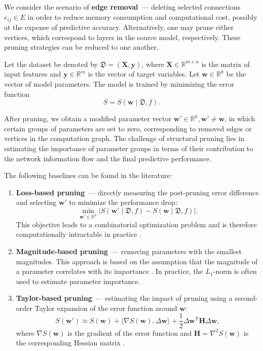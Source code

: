 \documentclass[runningheads]{llncs}
\begin{document}
We consider the scenario of \textbf{edge removal}~--- deleting selected connections $e_{ij} \in E$ in order to reduce memory consumption and computational cost, possibly at the expense of predictive accuracy. Alternatively, one may prune either vertices, which correspond to layers in the source model, respectively. These pruning strategies can be reduced to one another.

Let the dataset be denoted by $\mathfrak{D} = (\mathbf{X}, \mathbf{y})$, where $\mathbf{X} \in \mathbb{R}^{m \times n}$ is the matrix of input features and $\mathbf{y} \in \mathbb{R}^m$ is the vector of target variables. Let $\mathbf{w} \in \mathbb{R}^k$ be the vector of model parameters. The model is trained by minimizing the error function
\begin{equation}
S = S(\mathbf{w} \mid \mathfrak{D}, f).
\end{equation}

After pruning, we obtain a modified parameter vector $\mathbf{w}' \in \mathbb{R}^k, \mathbf{w}' \neq \mathbf{w}$, in which certain groups of parameters are set to zero, corresponding to removed edges or vertices in the computation graph. The challenge of structural pruning lies in estimating the importance of parameter groups in terms of their contribution to the network information flow and the final predictive performance.

The following baselines can be found in the literature:
\begin{enumerate}
    \item \textbf{Loss-based pruning}~--- directly measuring the post-pruning error difference and selecting $\mathbf{w}'$ to minimize the performance drop:
    \begin{equation}
    \label{eq:loss_pruning}
    \min_{\mathbf{w}' \in \mathbb{R}^k}
    \left|
    S(\mathbf{w}' \mid \mathfrak{D}, f)
    -
    S(\mathbf{w} \mid \mathfrak{D}, f)
    \right|.
    \end{equation}
    This objective leads to a combinatorial optimization problem and is therefore computationally intractable in practice \cite{Molchanov2019}.

    \item \textbf{Magnitude-based pruning}~--- removing parameters with the smallest magnitudes. This approach is based on the assumption that the magnitude of a parameter correlates with its importance \cite{Han2015}. In practice, the $L_1$-norm is often used to estimate parameter importance.
    
    \item \textbf{Taylor-based pruning}~--- estimating the impact of pruning using a second-order Taylor expansion of the error function around $\mathbf{w}$:
    \begin{equation}
    S(\mathbf{w}')
    \approx
    S(\mathbf{w})
    +
    \langle \nabla S(\mathbf{w}), \Delta \mathbf{w} \rangle
    +
    \frac{1}{2}
    \Delta \mathbf{w}^{\mathsf{T}}
    \mathbf{H}
    \Delta \mathbf{w},
    \end{equation}
    where $\nabla S(\mathbf{w})$ is the gradient of the error function and $\mathbf{H} = \nabla^2 S(\mathbf{w})$ is the corresponding Hessian matrix \cite{Molchanov2019}.
\end{enumerate}
\end{document}
